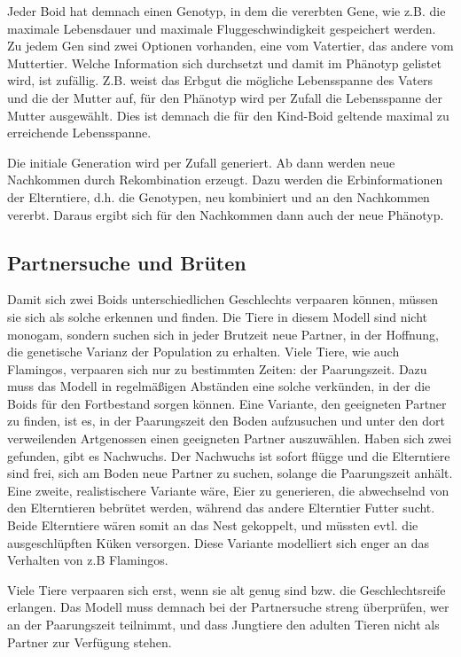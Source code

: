 \documentclass[draft=false
              ,paper=a4
              ,twoside=false
              ,fontsize=11pt
              ,headsepline
              ,BCOR10mm
              ,DIV11
              ,bibtotoc
              ,liststotoc
              ]{scrbook}
\begin{document}
Jeder Boid hat demnach einen Genotyp, in dem die vererbten Gene, wie z.B. die maximale Lebensdauer und maximale Fluggeschwindigkeit gespeichert werden. Zu jedem Gen sind zwei Optionen vorhanden, eine vom Vatertier, das andere vom Muttertier. Welche Information sich durchsetzt und damit im Phänotyp gelistet wird, ist zufällig. Z.B. weist das Erbgut die mögliche Lebensspanne des Vaters und die der Mutter auf, für den Phänotyp wird per Zufall die Lebensspanne der Mutter ausgewählt. Dies ist demnach die für den Kind-Boid geltende maximal zu erreichende Lebensspanne.

Die initiale Generation wird per Zufall generiert. Ab dann werden neue Nachkommen durch Rekombination erzeugt. Dazu werden die Erbinformationen der Elterntiere, d.h. die Genotypen, neu kombiniert und an den Nachkommen vererbt. Daraus ergibt sich für den Nachkommen dann auch der neue Phänotyp.

\subsection{Partnersuche und Brüten}
Damit sich zwei Boids unterschiedlichen Geschlechts verpaaren können, müssen sie sich als solche erkennen und finden. Die Tiere in diesem Modell sind nicht monogam, sondern suchen sich in jeder Brutzeit neue Partner, in der Hoffnung, die genetische Varianz der Population zu erhalten.
Viele Tiere, wie auch Flamingos, verpaaren sich nur zu bestimmten Zeiten: der Paarungszeit. Dazu muss das Modell in regelmäßigen Abständen eine solche verkünden, in der die Boids für den Fortbestand sorgen können.
Eine Variante, den geeigneten Partner zu finden, ist es, in der Paarungszeit den Boden aufzusuchen und unter den dort verweilenden Artgenossen einen geeigneten Partner auszuwählen. Haben sich zwei gefunden, gibt es Nachwuchs. Der Nachwuchs ist sofort flügge und die Elterntiere sind frei, sich am Boden neue Partner zu suchen, solange die Paarungszeit anhält.
Eine zweite, realistischere Variante wäre, Eier zu generieren, die abwechselnd von den Elterntieren bebrütet werden, während das andere Elterntier Futter sucht. Beide Elterntiere wären somit an das Nest gekoppelt, und müssten evtl. die ausgeschlüpften Küken versorgen. Diese Variante modelliert sich enger an das Verhalten von z.B Flamingos.

Viele Tiere verpaaren sich erst, wenn sie alt genug sind bzw. die Geschlechtsreife erlangen. Das Modell muss demnach bei der Partnersuche streng überprüfen, wer an der Paarungszeit teilnimmt, und dass Jungtiere den adulten Tieren nicht als Partner zur Verfügung stehen.
\end{document}
